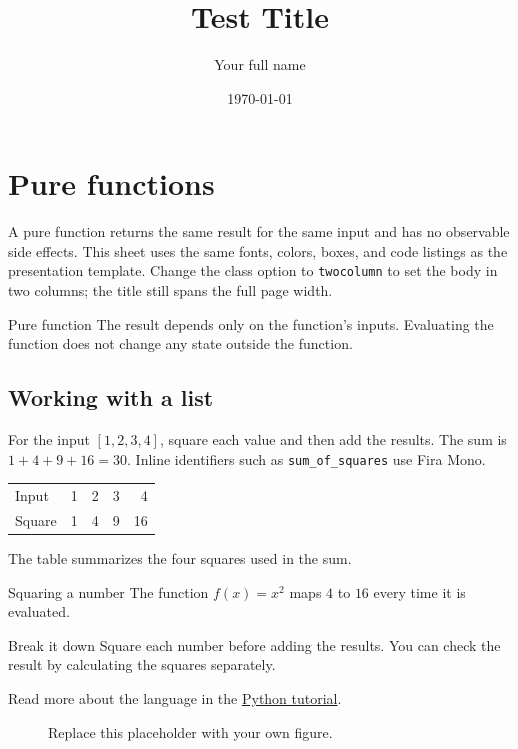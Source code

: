 \documentclass[onecolumn,nolinenumbers]{baysheet}
\title{Test Title}
\author{Your full name}
\date{\today}
\begin{document}
\maketitle

\section{Pure functions}
A pure function returns the same result for the same input and has no
observable side effects. This sheet uses the same fonts, colors, boxes,
and code listings as the presentation template. Change the class option
to \texttt{twocolumn} to set the body in two columns; the title still spans
the full page width.

\begin{definitionbox}{Pure function}
The result depends only on the function's inputs. Evaluating the function
does not change any state outside the function.
\end{definitionbox}

\subsection{Working with a list}
For the input $[1,2,3,4]$, square each value and then add the results.
The sum is $1+4+9+16=30$. Inline identifiers such as
\texttt{sum\_of\_squares} use Fira Mono.

\begin{center}
\begin{tabular}{lrrrr}
Input  & 1 & 2 & 3 & 4 \\
Square & 1 & 4 & 9 & 16
\end{tabular}
\end{center}

The table summarizes the four squares used in the sum.

\begin{examplebox}{Squaring a number}
The function $f(x)=x^2$ maps $4$ to $16$ every time it is evaluated.
\end{examplebox}

\begin{hintbox}{Break it down}
Square each number before adding the results. You can check the result
by calculating the squares separately.
\end{hintbox}

Read more about the language in the
\href{https://docs.python.org/3/tutorial/}{Python tutorial}.

\begin{figure}[htbp]
\centering
\fbox{\rule{0pt}{12mm}\rule{.65\linewidth}{0pt}}
\caption{Replace this placeholder with your own figure.}
\end{figure}
\end{document}
